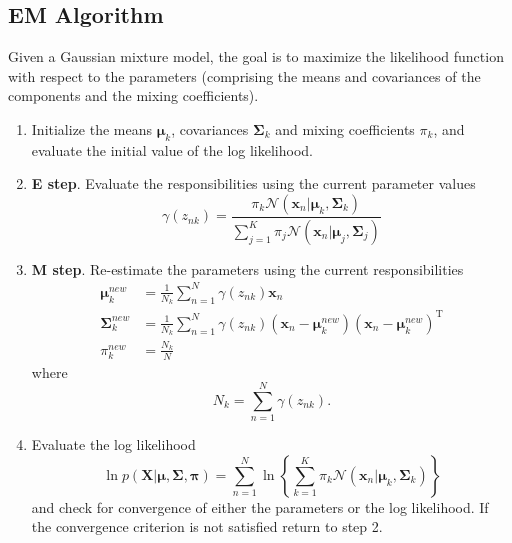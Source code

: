 ﻿\documentclass[a4paper, 11pt]{article}
\numberwithin{equation}{subsection}
\begin{document}
\subsection{EM Algorithm}
Given a Gaussian mixture model, the goal is to maximize the likelihood function with respect to the parameters (comprising the means and covariances of the components and the mixing coefficients).
\begin{enumerate}
	\item Initialize the means $\boldsymbol\mu_k$, covariances $\boldsymbol\Sigma_k$ and mixing coefficients $\pi_k$, and evaluate the initial value of the log likelihood.
	\item \textbf{E step}. Evaluate the responsibilities using the current parameter values
	\begin{equation}
	\gamma(z_{nk})=\frac{\pi_k\mathcal N(\mathbf x_n|\boldsymbol\mu_k,\boldsymbol\Sigma_k)}{\sum_{j=1}^K\pi_j\mathcal N(\mathbf x_n|\boldsymbol\mu_j,\boldsymbol\Sigma_j)}
	\end{equation}
	\item \textbf{M step}. Re-estimate the parameters using the current responsibilities
	\begin{align}
	\boldsymbol\mu_k^{new}&=\frac{1}{N_k}\sum_{n=1}^N\gamma(z_{nk})\mathbf x_n\\
	\boldsymbol\Sigma_k^{new}&=\frac{1}{N_k}\sum_{n=1}^N\gamma(z_{nk})(\mathbf x_n-\boldsymbol\mu_k^{new})(\mathbf x_n-\boldsymbol\mu_k^{new})^{\mathrm T}\\
	\pi_k^{new}&=\frac{N_k}{N}
	\end{align}
	where
	\begin{equation}
	N_k=\sum_{n=1}^N\gamma(z_{nk}).
	\end{equation}
	\item Evaluate the log likelihood
	\begin{equation}
	\ln p(\mathbf X|\boldsymbol\mu,\boldsymbol\Sigma,\boldsymbol\pi)=\sum_{n=1}^N\ln \left\{\sum_{k=1}^K\pi_k\mathcal N(\mathbf x_n|\boldsymbol\mu_k,\boldsymbol\Sigma_k)\right\}
	\end{equation}
	and check for convergence of either the parameters or the log likelihood. If the convergence criterion is not satisfied return to step 2.

\end{enumerate}
\end{document}
